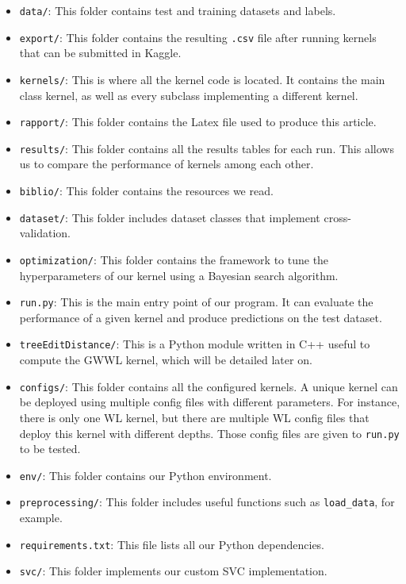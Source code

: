 \documentclass{IEEEtran}
\begin{document}
\begin{itemize}
    \item \texttt{data/}: This folder contains test and training datasets and labels.
    \item \texttt{export/}: This folder contains the resulting \texttt{.csv} file after running kernels that can be submitted in Kaggle.
    \item \texttt{kernels/}: This is where all the kernel code is located. It contains the main class kernel, as well as every subclass implementing a different kernel.
    \item \texttt{rapport/}: This folder contains the Latex file used to produce this article.
    \item \texttt{results/}: This folder contains all the results tables for each run. This allows us to compare the performance of kernels among each other.
    \item \texttt{biblio/}: This folder contains the resources we read.
    \item \texttt{dataset/}: This folder includes dataset classes that implement cross-validation.
    \item \texttt{optimization/}: This folder contains the framework to tune the hyperparameters of our kernel using a Bayesian search algorithm.
    \item \texttt{run.py}: This is the main entry point of our program. It can evaluate the performance of a given kernel and produce predictions on the test dataset.
    \item \texttt{treeEditDistance/}: This is a Python module written in C++ useful to compute the GWWL kernel, which will be detailed later on.
    \item \texttt{configs/}: This folder contains all the configured kernels. A unique kernel can be deployed using multiple config files with different parameters. For instance, there is only one WL kernel, but there are multiple WL config files that deploy this kernel with different depths. Those config files are given to \texttt{run.py} to be tested.
    \item \texttt{env/}: This folder contains our Python environment.
    \item \texttt{preprocessing/}: This folder includes useful functions such as \texttt{load\_data}, for example.
    \item \texttt{requirements.txt}: This file lists all our Python dependencies.
    \item \texttt{svc/}: This folder implements our custom SVC implementation.
\end{itemize}
\end{document}
